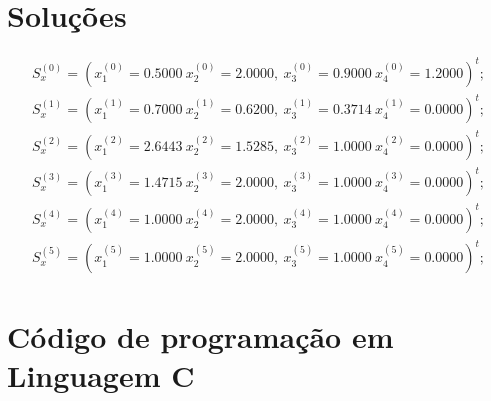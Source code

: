 \documentclass[12pt]{article}
\begin{document}
        \section{Soluções}

            \begin{align*}
                S_x^{(0)} = (x_1^{(0)} = 0.5000\ x_2^{(0)}= 2.0000,\ x_3^{(0)}= 0.9000\ x_4^{(0)}= 1.2000)^t;\\
                S_x^{(1)} = (x_1^{(1)} = 0.7000\ x_2^{(1)}= 0.6200,\ x_3^{(1)}= 0.3714\ x_4^{(1)}= 0.0000)^t;\\
                S_x^{(2)} = (x_1^{(2)} = 2.6443\ x_2^{(2)}= 1.5285,\ x_3^{(2)}= 1.0000\ x_4^{(2)}= 0.0000)^t;\\
                S_x^{(3)} = (x_1^{(3)} = 1.4715\ x_2^{(3)}= 2.0000,\ x_3^{(3)}= 1.0000\ x_4^{(3)}= 0.0000)^t;\\
                S_x^{(4)} = (x_1^{(4)} = 1.0000\ x_2^{(4)}= 2.0000,\ x_3^{(4)}= 1.0000\ x_4^{(4)}= 0.0000)^t;\\
                S_x^{(5)} = (x_1^{(5)} = 1.0000\ x_2^{(5)}= 2.0000,\ x_3^{(5)}= 1.0000\ x_4^{(5)}= 0.0000)^t;
            \end{align*}

        \section{Código de programação em Linguagem C}
\end{document}
